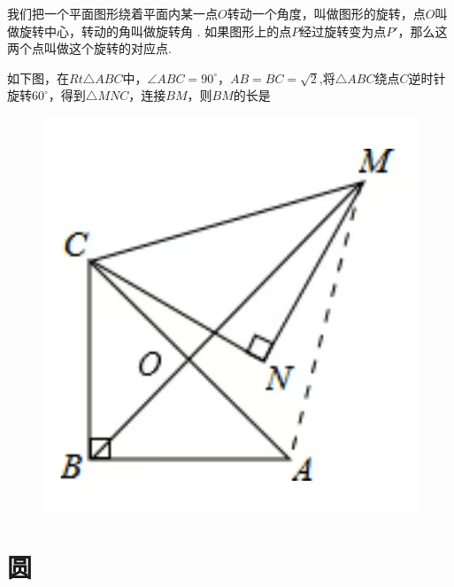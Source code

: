 \documentclass[lang=cn, 10pt, titlestyle=hang, oneside]{elegantbook}
\begin{document}
我们把一个平面图形绕着平面内某一点\(O \)转动一个角度，叫做图形的旋转，点\(O \)叫做旋转中心，转动的角叫做旋转角 . 如果图形上的点\(P \)经过旋转变为点\(P' \)，那么这两个点叫做这个旋转的对应点.

\begin{example}
    如下图，在\(Rt\triangle ABC \)中，\(\angle ABC = 90^\circ \)，\(AB=BC=\sqrt{2}\),将\(\triangle ABC\)绕点\(C\)逆时针旋转\(60^\circ\)，得到\(\triangle MNC\)，连接\(BM\)，则\(BM\)的长是 \underline{\hspace{3em}}
    
\begin{figure}[h]
    \raggedright
    \includegraphics[width=0.25\linewidth]{figure/example_rotation1.jpg}
    
    \label{fig:enter-label}
\end{figure}
    
\end{example}



\chapter{圆}
\end{document}
